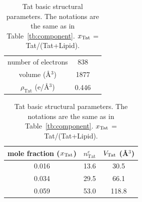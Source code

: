 \begin{table}[htbp]
  \centering
  \begin{tabular}{c c c}
    \hline
    number of electrons & 838 \\ 
    volume (\AA$^3$) & 1877 \\
    $\rho_\textrm{Tat}$ (e/\AA$^3$) & 0.446 \\
    \hline
  \end{tabular}
  \quad
  \begin{tabular}{ ccc }
    \hline
    mole fraction ($x_\textrm{Tat}$) & $n^e_\textrm{Tat}$ & $V_\textrm{Tat}$ (\AA$^3$) \\    
    \hline
    0.016 & 13.6 & 30.5 \\
    0.034 & 29.5 & 66.1 \\
    0.059 & 53.0 & 118.8 \\
    \hline
  \end{tabular}
  \caption{Tat basic structural parameters. The notations are the same
  as in Table~\ref{tb:component}. $x_\textrm{Tat}$ = Tat/(Tat+Lipid).}
  \label{tb:Tat_basic_params}
\end{table}


